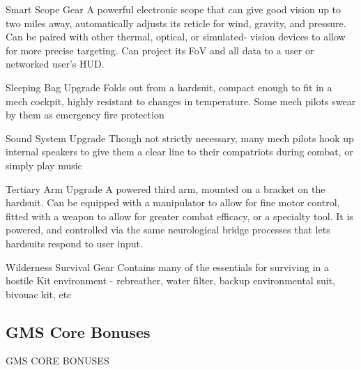 Smart Scope                   Gear           A powerful electronic scope that can give good vision up to two  
                                             miles away, automatically adjusts its reticle for wind, gravity, and  
                                             pressure. Can be paired with other thermal, optical, or simulated- 
                                             vision devices to allow for more precise targeting. Can project its  
                                             FoV and all data to a user or networked user’s HUD.   

Sleeping Bag                  Upgrade        Folds out from a hardsuit, compact enough to fit in a mech  
                                             cockpit, highly resistant to changes in temperature. Some mech  
                                             pilots swear by them as emergency fire protection 

Sound System                  Upgrade        Though not strictly necessary, many mech pilots hook up internal  
                                             speakers to give them a clear line to their compatriots during  
                                             combat, or simply play music 

Tertiary Arm                  Upgrade        A powered third arm, mounted on a bracket on the hardsuit. Can  
                                             be equipped with a manipulator to allow for fine motor control,  
                                             fitted with a weapon to allow for greater combat efficacy, or a  
                                             specialty tool. It is powered, and controlled via the same  
                                             neurological bridge processes that lets hardsuits respond to user  
                                             input.  

Wilderness Survival           Gear           Contains many of the essentials for surviving in a hostile  
Kit                                          environment - rebreather, water filter, backup environmental suit,  
                                             bivouac kit, etc 

                                                                                                                         

\subsection{GMS Core Bonuses}
                                      GMS CORE BONUSES  

